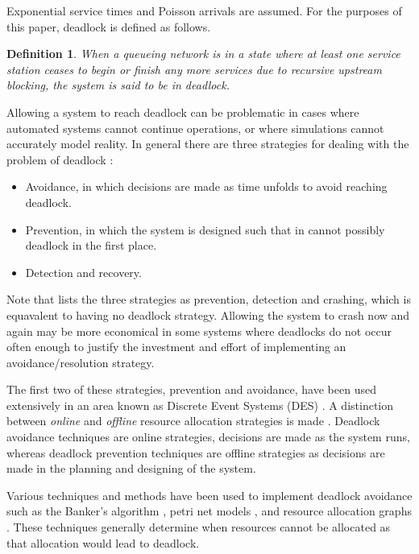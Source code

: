 \documentclass{article}
\newtheorem{definition}{Definition}
\numberwithin{equation}{section}
\begin{document}
Exponential service times and Poisson arrivals are assumed.
For the purposes of this paper, deadlock is defined as follows.\\

\begin{definition}
    When a queueing network is in a state where at least one service
    station ceases to begin or finish any more services due to
    recursive upstream blocking, the system is said to be in deadlock.
\end{definition}


Allowing a system to reach deadlock can be problematic in cases where automated systems cannot continue operations, or where simulations cannot accurately model reality.
In general there are three strategies for dealing with the problem of deadlock \cite{kawadkaretal14, elmagarmid86, venkateshsmith05}:

\begin{itemize}
  \item Avoidance, in which decisions are made as time unfolds to avoid reaching deadlock.
  \item Prevention, in which the system is designed such that in cannot possibly deadlock in the first place.
  \item Detection and recovery.
\end{itemize}

Note that \cite{holt72} lists the three strategies as prevention, detection and crashing, which is equavalent to having no deadlock strategy.
Allowing the system to crash now and again may be more economical in some systems where deadlocks do not occur often enough to justify the investment and effort of implementing an avoidance/resolution strategy.

The first two of these strategies, prevention and avoidance, have been used extensively in an area known as Discrete Event Systems (DES) \cite{reveliotis15a, reveliotis15b}.
A distinction between \textit{online} and \textit{offline} resource allocation strategies is made \cite{venkateshsmith05}.
Deadlock avoidance techniques are online strategies, decisions are made as the system runs, whereas deadlock prevention techniques are offline strategies as decisions are made in the planning and designing of the system.

Various techniques and methods have been used to implement deadlock avoidance such as the Banker's algorithm \cite{dijkstra82, kawadkaretal14}, petri net models \cite{viswanadhametal90, ezpeletaetal02}, and resource allocation graphs \cite{belik90}.
These techniques generally determine when resources cannot be allocated as that allocation would lead to deadlock.
\end{document}
